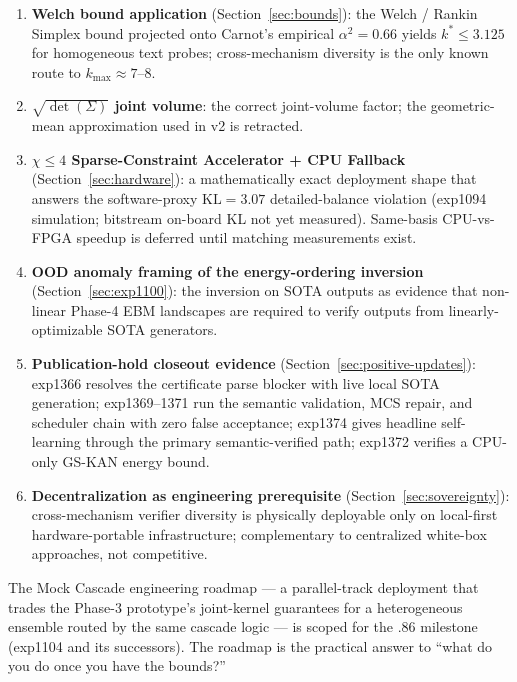 \documentclass[10pt]{article}
\begin{document}
\begin{enumerate}
  \item \textbf{Welch bound application} (Section~\ref{sec:bounds}):
        the Welch / Rankin Simplex bound projected onto Carnot's
        empirical $\alpha^2 = 0.66$ yields $k^* \leq 3.125$ for
        homogeneous text probes; cross-mechanism diversity is the
        only known route to $k_{\max} \approx 7\text{--}8$.
  \item \textbf{$\sqrt{\det(\Sigma)}$ joint volume}: the correct
        joint-volume factor; the geometric-mean approximation used
        in v2 is retracted.
  \item \textbf{$\chi \leq 4$ Sparse-Constraint Accelerator + CPU
        Fallback} (Section~\ref{sec:hardware}): a mathematically
        exact deployment shape that answers the software-proxy
        $\mathrm{KL} = 3.07$ detailed-balance violation (exp1094
        simulation; bitstream on-board KL not yet measured). Same-basis
        CPU-vs-FPGA speedup is deferred until matching measurements
        exist.
  \item \textbf{OOD anomaly framing of the energy-ordering inversion}
        (Section~\ref{sec:exp1100}): the inversion on SOTA outputs
        as evidence that non-linear Phase-4 EBM landscapes are
        required to verify outputs from linearly-optimizable SOTA
        generators.
  \item \textbf{Publication-hold closeout evidence}
        (Section~\ref{sec:positive-updates}): exp1366 resolves the
        certificate parse blocker with live local SOTA generation;
        exp1369--1371 run the semantic validation, MCS repair, and
        scheduler chain with zero false acceptance; exp1374 gives
        headline self-learning through the primary semantic-verified
        path; exp1372 verifies a CPU-only GS-KAN energy bound.
  \item \textbf{Decentralization as engineering prerequisite}
        (Section~\ref{sec:sovereignty}): cross-mechanism verifier
        diversity is physically deployable only on local-first
        hardware-portable infrastructure; complementary to
        centralized white-box approaches, not competitive.
\end{enumerate}

The Mock Cascade engineering roadmap --- a parallel-track deployment
that trades the Phase-3 prototype's joint-kernel guarantees for a
heterogeneous ensemble routed by the same cascade logic --- is scoped
for the .86 milestone (exp1104 and its successors). The roadmap is
the practical answer to ``what do you do once you have the bounds?''
\end{document}
